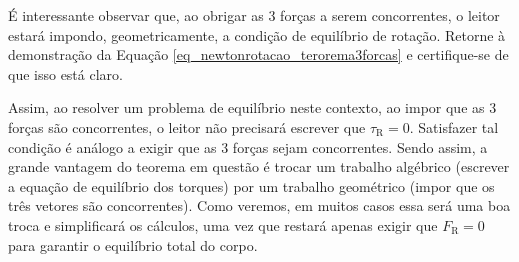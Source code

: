 
É interessante observar que, ao obrigar as 3 forças a serem concorrentes, o leitor estará impondo, geometricamente, a condição de equilíbrio de rotação. Retorne à demonstração da Equação \eqref{eq_newtonrotacao_terorema3forcas} e certifique-se de que isso está claro.

Assim, ao resolver um problema de equilíbrio neste contexto, ao impor que as 3 forças são concorrentes, o leitor não precisará escrever que $\tau_\text{R}=0.$ Satisfazer tal condição é análogo a exigir que as 3 forças sejam concorrentes. Sendo assim, a grande vantagem do teorema em questão é trocar um trabalho algébrico (escrever a equação de equilíbrio dos torques) por um trabalho geométrico (impor que os três vetores são concorrentes). Como veremos, em muitos casos essa será uma boa troca e simplificará os cálculos, uma vez que restará apenas exigir que $F_\text{R}=0$ para garantir o equilíbrio total do corpo.


\vspace{0.3cm}



